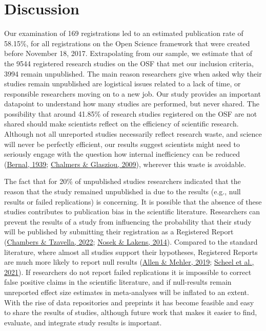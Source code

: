 \documentclass[
  ,jou, a4paper,floatsintext]{apa6}
\begin{document}
\hypertarget{discussion}{%
\section{Discussion}\label{discussion}}

Our examination of 169 registrations led to an estimated publication rate of 58.15\%, for all registrations on the Open Science framework that were created before November 18, 2017. Extrapolating from our sample, we estimate that of the 9544 registered research studies on the OSF that met our inclusion criteria, 3994 remain unpublished. The main reason researchers give when asked why their studies remain unpublished are logistical issues related to a lack of time, or responsible researchers moving on to a new job. Our study provides an important datapoint to understand how many studies are performed, but never shared. The possibility that around 41.85\% of research studies registered on the OSF are not shared should make scientists reflect on the efficiency of scientific research. Although not all unreported studies necessarily reflect research waste, and science will never be perfectly efficient, our results suggest scientists might need to seriously engage with the question how internal inefficiency can be reduced (\protect\hyperlink{ref-bernal_social_1939}{Bernal, 1939}; \protect\hyperlink{ref-chalmers_avoidable_2009}{Chalmers \& Glasziou, 2009}), wherever this waste is avoidable.

The fact that for 20\% of unpublished studies researchers indicated that the reason that the study remained unpublished ia due to the results (e.g., null results or failed replications) is concerning. It is possible that the absence of these studies contributes to publication bias in the scientific literature. Researchers can prevent the results of a study from influencing the probability that their study will be published by submitting their registration as a Registered Report (\protect\hyperlink{ref-chambers_past_2022}{Chambers \& Tzavella, 2022}; \protect\hyperlink{ref-nosek_registered_2014}{Nosek \& Lakens, 2014}). Compared to the standard literature, where almost all studies support their hypotheses, Registered Reports are much more likely to report null results (\protect\hyperlink{ref-allen_open_2019}{Allen \& Mehler, 2019}; \protect\hyperlink{ref-scheel_excess_2021}{Scheel et al., 2021}). If researchers do not report failed replications it is impossible to correct false positive claims in the scientific literature, and if null-results remain unreported effect size estimates in meta-analyses will be inflated to an extent. With the rise of data repositories and preprints it has become feasible and easy to share the results of studies, although future work that makes it easier to find, evaluate, and integrate study results is important.
\end{document}
